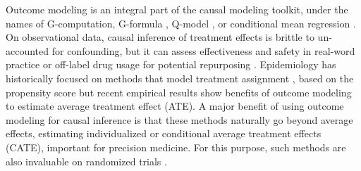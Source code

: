 \documentclass[10pt]{article}
\begin{document}
\begin{multicols}{2}


    Outcome modeling is an integral part of the causal modeling toolkit,
    under the names of
    G-computation, G-formula \cite{robins_role_1986}, Q-model
    \cite{snowden_implementation_2011}, or conditional mean
    regression \cite{wendling_comparing_2018}. On observational data, causal
    inference of treatment effects is brittle to un-accounted for
    confounding, but it can assess
    effectiveness and safety in real-word practice
    \cite{black1996we,hernan_methods_2021} or off-label drug usage
    \cite{radley2006off} for potential repurposing
    \cite{hurle2013computational,dudley2011exploiting}. Epidemiology has
    historically focused on methods that model treatment assignment
    \cite{austin_moving_2015,grose_use_2020}, based on the propensity score
    \cite{rosenbaum_central_1983} but recent empirical results
    \cite{wendling_comparing_2018,dorie_automated_2019} show benefits of
    outcome modeling to estimate average treatment effect (ATE). A major
    benefit of using outcome modeling for causal inference is that these
    methods naturally go beyond average effects,
    estimating individualized or conditional average treatment effects
    (CATE), important for precision medicine.
    For this purpose, such methods are also invaluable on randomized trials
    \cite{su2018random,lamont2018identification,hoogland2021tutorial}.


\end{multicols}
\end{document}
